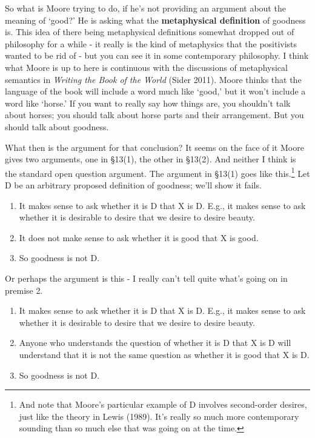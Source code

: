 \documentclass[
]{article}
\providecommand{\tightlist}{%
  \setlength{\itemsep}{0pt}\setlength{\parskip}{0pt}}
\begin{document}
So what is Moore trying to do, if he's not providing an argument about
the meaning of `good?' He is asking what the \textbf{metaphysical
definition} of goodness is. This idea of there being metaphysical
definitions somewhat dropped out of philosophy for a while - it really
is the kind of metaphysics that the positivists wanted to be rid of -
but you can see it in some contemporary philosophy. I think what Moore
is up to here is continuous with the discussions of metaphysical
semantics in \emph{Writing the Book of the World} (Sider 2011). Moore
thinks that the language of the book will include a word much like
`good,' but it won't include a word like `horse.' If you want to really
say how things are, you shouldn't talk about horses; you should talk
about horse parts and their arrangement. But you should talk about
goodness.

What then is the argument for that conclusion? It seems on the face of
it Moore gives two arguments, one in §13(1), the other in §13(2). And
neither I think is the standard open question argument. The argument in
§13(1) goes like this.\footnote{And note that Moore's particular example
  of D involves second-order desires, just like the theory in Lewis
  (1989). It's really so much more contemporary sounding than so much
  else that was going on at the time.} Let D be an arbitrary proposed
definition of goodness; we'll show it fails.

\begin{enumerate}
\def\labelenumi{\arabic{enumi}.}
\tightlist
\item
  It makes sense to ask whether it is D that X is D. E.g., it makes
  sense to ask whether it is desirable to desire that we desire to
  desire beauty.
\item
  It does not make sense to ask whether it is good that X is good.
\item
  So goodness is not D.
\end{enumerate}

Or perhaps the argument is this - I really can't tell quite what's going
on in premise 2.

\begin{enumerate}
\def\labelenumi{\arabic{enumi}.}
\tightlist
\item
  It makes sense to ask whether it is D that X is D. E.g., it makes
  sense to ask whether it is desirable to desire that we desire to
  desire beauty.
\item
  Anyone who understands the question of whether it is D that X is D
  will understand that it is not the same question as whether it is good
  that X is D.
\item
  So goodness is not D.
\end{enumerate}
\end{document}
